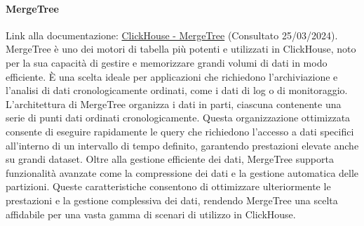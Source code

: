 \paragraph{MergeTree}\label{sec:MergeTree}
Link alla documentazione: \href{https://clickhouse.com/docs/en/engines/table-engines/mergetree-family/mergetree#mergetree}{ClickHouse - MergeTree} (Consultato 25/03/2024).\newline
MergeTree è uno dei motori di tabella più potenti e utilizzati in ClickHouse, noto per la sua capacità di gestire e memorizzare grandi volumi di dati in modo efficiente. È una scelta ideale per applicazioni che richiedono l'archiviazione e l'analisi di dati cronologicamente ordinati, come i dati di log o di monitoraggio. L'architettura di MergeTree organizza i dati in parti, ciascuna contenente una serie di punti dati ordinati cronologicamente. Questa organizzazione ottimizzata consente di eseguire rapidamente le query che richiedono l'accesso a dati specifici all'interno di un intervallo di tempo definito, garantendo prestazioni elevate anche su grandi dataset. Oltre alla gestione efficiente dei dati, MergeTree supporta funzionalità avanzate come la compressione dei dati e la gestione automatica delle partizioni. Queste caratteristiche consentono di ottimizzare ulteriormente le prestazioni e la gestione complessiva dei dati, rendendo MergeTree una scelta affidabile per una vasta gamma di scenari di utilizzo in ClickHouse.



